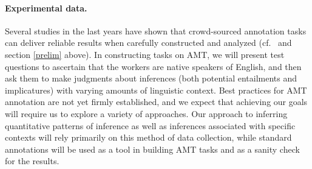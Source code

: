 \documentclass[10pt]{article}
\begin{document}


\vspace{-.15in}
\paragraph{Experimental data.}
Several studies in the last years have shown that crowd-sourced annotation tasks can deliver reliable results when carefully constructed and analyzed (cf.\ \cite{snow:08,munroetal2010} and section \ref{prelim} above). 
In constructing tasks on AMT, we will present test questions to ascertain that the workers are native speakers of English, and then ask them to make judgments about inferences (both potential entailments and implicatures) with varying amounts of linguistic context.
Best practices for AMT annotation are not yet firmly established, and we expect that achieving our goals will require us to explore a variety of approaches.
Our approach to inferring quantitative patterns of inference as well as inferences associated with specific contexts will rely primarily on this method of data collection, while standard annotations will be used as a tool in building AMT tasks and as a sanity check for the results. 
\end{document}
